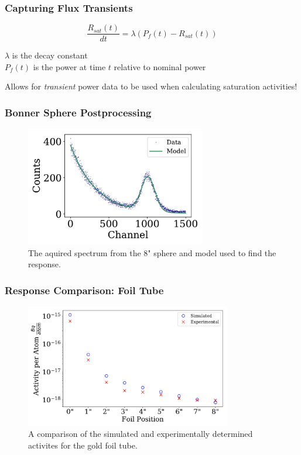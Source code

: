 \documentclass[fleqn]{beamer}
\begin{document}
\begin{frame}
\frametitle{Capturing Flux Transients}

\begin{equation}
\label{eqn:bateman_r_sat}
\frac{R_{sat}(t)}{dt} = \lambda (P_{f}(t) - R_{sat}(t))
\end{equation}

$\lambda$ is the decay constant\\
$P_f(t)$ is the power at time $t$ relative to nominal power

\vspace{0.05\textheight}

Allows for {\it transient} power data to be used when calculating saturation activities!

\end{frame}


\begin{frame}
\frametitle{Bonner Sphere Postprocessing}

\begin{figure}
\centering
\includegraphics[width = 0.7\textwidth]{bs4_spectrum}
\caption{The aquired spectrum from the 8" sphere and model used to find the response.}
\end{figure}

\end{frame}

\begin{frame}
\frametitle{Response Comparison: Foil Tube}

\begin{figure}
\centering
\includegraphics[width = 0.8\textwidth]{compare_activities}
\caption{A comparison of the simulated and experimentally determined activites for the gold foil tube.}
\end{figure}

\end{frame}
\end{document}
